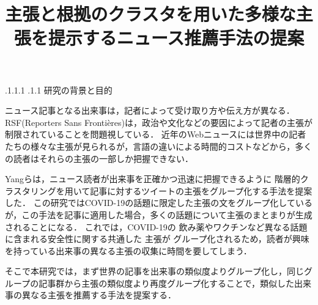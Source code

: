 \documentclass[a4paper, twocolumn, 10pt]{jarticle}
\makeatletter
\def\section{%
	\@startsection{section}{1}{\z@}%
	{.1\Cvs \@plus.1\Cdp \@minus.1\Cdp}%
	{.1\Cvs \@plus.1\Cdp}%
	{\normalfont\normalsize\bfseries}%
}
\makeatother
\begin{document}
\title{主張と根拠のクラスタを用いた多様な主張を提示するニュース推薦手法の提案}

\maketitle

\thispagestyle{empty}

\section{研究の背景と目的}

ニュース記事となる出来事は，記者によって受け取り方や伝え方が異なる．
RSF(Reporters Sans Frontières)は，政治や文化などの要因によって記者の主張が制限されていることを問題視している\cite{2021_world_press_freedom_index}．
近年のWebニュースには世界中の記者たちの様々な主張が見られるが，言語の違いによる時間的コストなどから，多くの読者はそれらの主張の一部しか把握できない．

Yangらは，ニュース読者が出来事を正確かつ迅速に把握できるように
階層的クラスタリングを用いて記事に対するツイートの主張をグループ化する手法を提案した\cite{yang_scalable_2021}．
この研究ではCOVID-19の話題に限定した主張の文をグループ化しているが，この手法を記事に適用した場合，多くの話題について主張のまとまりが生成されることになる．
これでは，COVID-19の
飲み薬やワクチンなど異なる話題に含まれる安全性に関する共通した
主張が
グループ化されるため，読者が興味を持っている出来事の異なる主張の収集に時間を要してしまう．






そこで本研究では，まず世界の記事を出来事の類似度よりグループ化し，同じグループの記事群から主張の類似度より再度グループ化することで，類似した出来事の異なる主張を推薦する手法を提案する．
\end{document}
